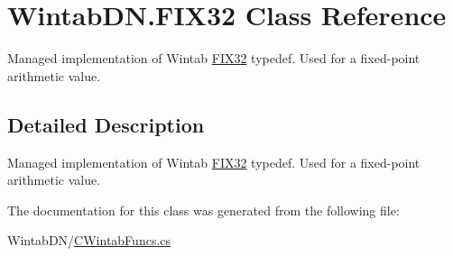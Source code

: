 \hypertarget{class_wintab_d_n_1_1_f_i_x32}{}\section{Wintab\+D\+N.\+F\+I\+X32 Class Reference}
\label{class_wintab_d_n_1_1_f_i_x32}


Managed implementation of Wintab \mbox{\hyperlink{class_wintab_d_n_1_1_f_i_x32}{F\+I\+X32}} typedef. Used for a fixed-\/point arithmetic value.  




\subsection{Detailed Description}
Managed implementation of Wintab \mbox{\hyperlink{class_wintab_d_n_1_1_f_i_x32}{F\+I\+X32}} typedef. Used for a fixed-\/point arithmetic value. 



The documentation for this class was generated from the following file\+:\begin{DoxyCompactItemize}
\item 
Wintab\+D\+N/\mbox{\hyperlink{_c_wintab_funcs_8cs}{C\+Wintab\+Funcs.\+cs}}\end{DoxyCompactItemize}
